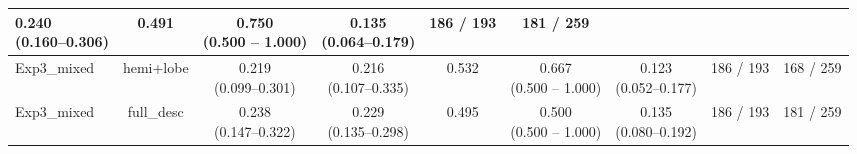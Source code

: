 \documentclass[a4paper,12pt]{article}
\begin{document}
\begin{table}[ht]
\begin{tabular}{lcccccccc}
\makecell{\colorbox{green!20}{0.240} \\ (0.160--0.306)} &
0.491 &
\makecell{0.750 \\ (0.500 -- 1.000)}&
\makecell{\colorbox{green!20}{0.135} \\ (0.064--0.179)} &
186 / 193 &
\colorbox{green!20}{181 / 259} \\
\hline
Exp3\_mixed &
hemi+lobe & 
\makecell{0.219 \\ (0.099--0.301)} &
\makecell{0.216 \\ (0.107--0.335)} &
\colorbox{green!20}{0.532} &
\makecell{0.667 \\ (0.500 -- 1.000)}&
\makecell{0.123 \\ (0.052--0.177)} &
186 / 193 &
168 / 259 \\
\hline
Exp3\_mixed &
full\_desc &
\makecell{\colorbox{green!20}{0.238} \\ (0.147--0.322)} &
\makecell{\colorbox{orange!20}{0.229} \\ (0.135--0.298)} &
0.495 &
\makecell{0.500 \\ (0.500 -- 1.000)}&
\makecell{\colorbox{green!20}{0.135} \\ (0.080--0.192)} &
186 / 193 &
\colorbox{green!20}{181 / 259} \\
\hline
\end{tabular}
\end{table}
\end{document}
